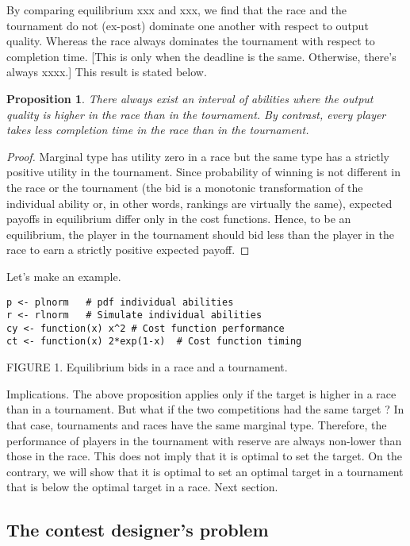 \documentclass[10pt, titlepage]{article}
\newtheorem{proposition}{Proposition}
\begin{document}
By comparing equilibrium xxx and xxx, we find that the race and the
tournament do not (ex-post) dominate one another with respect to output
quality. Whereas the race always dominates the tournament with respect
to completion time. {[}This is only when the deadline is the same.
Otherwise, there's always xxxx.{]} This result is stated below.

\begin{proposition}
There always exist an interval of abilities where the output quality is higher in the race than in the tournament. By contrast, every player takes less completion time in the race than in the tournament.
\end{proposition}

\begin{proof}
Marginal type has utility zero in a race but the same type has a strictly positive utility in the tournament. Since probability of winning is not different in the race or the tournament (the bid is a monotonic transformation of the individual ability or, in other words, rankings are virtually the same), expected payoffs in equilibrium differ only in the cost functions. Hence, to be an equilibrium, the player in the tournament should bid less than the player in the race to earn a strictly positive expected payoff. 
\end{proof}

Let's make an example.

\begin{verbatim}
p <- plnorm   # pdf individual abilities 
r <- rlnorm   # Simulate individual abilities
cy <- function(x) x^2 # Cost function performance
ct <- function(x) 2*exp(1-x)  # Cost function timing 
\end{verbatim}

FIGURE 1. Equilibrium bids in a race and a tournament.

Implications. The above proposition applies only if the target is higher
in a race than in a tournament. But what if the two competitions had the
same target ? In that case, tournaments and races have the same marginal
type. Therefore, the performance of players in the tournament with
reserve are always non-lower than those in the race. This does not imply
that it is optimal to set the target. On the contrary, we will show that
it is optimal to set an optimal target in a tournament that is below the
optimal target in a race. Next section.

\subsection{The contest designer's
problem}\label{the-contest-designers-problem}
\end{document}
